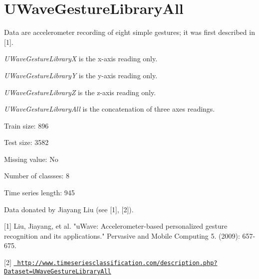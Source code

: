 \chapter{UWave\+Gesture\+Library\+All}
\hypertarget{md_external_2data_2UCRArchive__2018_2UWaveGestureLibraryAll_2README}{}\label{md_external_2data_2UCRArchive__2018_2UWaveGestureLibraryAll_2README}
\label{md_external_2data_2UCRArchive__2018_2UWaveGestureLibraryAll_2README_autotoc_md225}%
%
 Data are accelerometer recording of eight simple gestures; it was first described in \mbox{[}1\mbox{]}.

{\itshape UWave\+Gesture\+LibraryX} is the x-\/axis reading only.

{\itshape UWave\+Gesture\+LibraryY} is the y-\/axis reading only.

{\itshape UWave\+Gesture\+LibraryZ} is the z-\/axis reading only.

{\itshape UWave\+Gesture\+Library\+All} is the concatenation of three axes readings.

Train size\+: 896

Test size\+: 3582

Missing value\+: No

Number of classses\+: 8

Time series length\+: 945

Data donated by Jiayang Liu (see \mbox{[}1\mbox{]}, \mbox{[}2\mbox{]}).

\mbox{[}1\mbox{]} Liu, Jiayang, et al. "{}u\+Wave\+: Accelerometer-\/based personalized gesture recognition and its applications."{} Pervasive and Mobile Computing 5. (2009)\+: 657-\/675.

\mbox{[}2\mbox{]} \href{http://www.timeseriesclassification.com/description.php?Dataset=UWaveGestureLibraryAll}{\texttt{ http\+://www.\+timeseriesclassification.\+com/description.\+php?\+Dataset=\+UWave\+Gesture\+Library\+All}} 